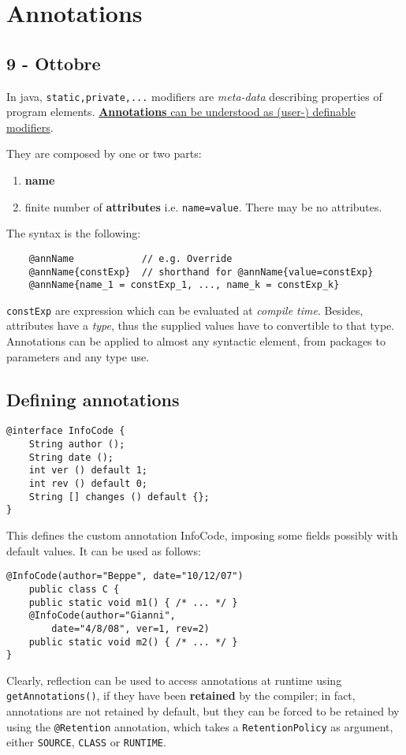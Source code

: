 \chapter{Annotations}
\section*{9 - Ottobre}
In java, \lstinline{static,private,...} modifiers are \textit{meta-data} describing properties of program elements.
\ul{\textbf{Annotations} can be understood as (user-) definable modifiers}.
{They are composed by one or two parts:\ns
\begin{enumerate}
    \item \textbf{name}
    \item finite number of \textbf{attributes} i.e. \lstinline{name=value}.
    There may be no attributes.
\end{enumerate}}
The syntax is the following:
\begin{lstlisting}
    @annName            // e.g. Override
    @annName{constExp}  // shorthand for @annName{value=constExp}
    @annName{name_1 = constExp_1, ..., name_k = constExp_k}
\end{lstlisting}
\lstinline{constExp} are expression which can be evaluated at \textit{compile time}.
Besides, attributes have a \textit{type}, thus the supplied values have to
convertible to that type.\\
Annotations can be applied to almost any syntactic element, from packages to parameters and any type use.

\section{Defining annotations}
\begin{lstlisting}
@interface InfoCode {
    String author ();
    String date ();
    int ver () default 1;
    int rev () default 0;
    String [] changes () default {};
}
\end{lstlisting}

This defines the custom annotation InfoCode, imposing some fields possibly with default values.
It can be used as follows:
\begin{lstlisting}
@InfoCode(author="Beppe", date="10/12/07")
    public class C {
    public static void m1() { /* ... */ }
    @InfoCode(author="Gianni",
        date="4/8/08", ver=1, rev=2)
    public static void m2() { /* ... */ }
}
\end{lstlisting}

Clearly, reflection can be used to access annotations at runtime using \lstinline|getAnnotations()|, if they have been \textbf{retained} by the compiler;
in fact, annotations are not retained by default, but they can be forced to be retained by using the \lstinline{@Retention} annotation, which takes a \lstinline{RetentionPolicy} as argument, either \lstinline{SOURCE}, \lstinline{CLASS} or \lstinline{RUNTIME}.